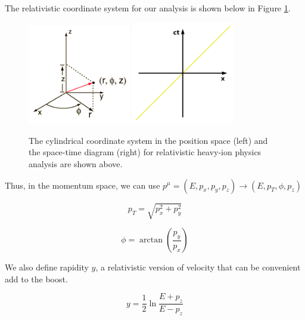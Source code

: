The relativistic coordinate system for our analysis is shown below in Figure \ref{HICoordinates}. 

\begin{figure}[hbtp]
\begin{center}
\includegraphics[width=0.40\textwidth]{Figures/Chapter1/PosCylindrical.png}
\includegraphics[width=0.40\textwidth]{Figures/Chapter1/STDiagram.png}
\caption{The cylindrical coordinate system in the position space (left) and the space-time diagram (right) for relativistic heavy-ion physics analysis are shown above.}
\label{HICoordinates}
\end{center}
\end{figure} 


Thus, in the momentum space, we can use $p^\mu = (E,p_x, p_y, p_z) \rightarrow  (E,p_T, \phi, p_z)$ 

\begin{equation}
p_T = \sqrt{p_x^2 + p_y^2}
\end{equation}

\begin{equation}
\phi = \arctan(\frac{p_y}{p_x})
\end{equation}

We also define rapidity $y$, a relativistic version of velocity that can be convenient add to the boost.

\begin{equation}
y = \frac{1}{2} \ln \frac{E+p_z}{E-p_z}
\end{equation}



